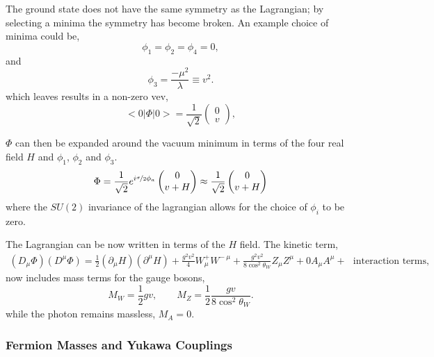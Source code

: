 The ground state does not have the same symmetry as the Lagrangian; by
selecting a minima the symmetry has become broken. An example choice of minima
could be,
\begin{equation}
\phi_{1} = \phi_{2} = \phi_{4} = 0,
\end{equation}
and
\begin{equation}
\phi_{3} = \frac{-\mu^{2}}{\lambda} \equiv v^{2}.
\end{equation}
which leaves results in a non-zero \ac{vev},
\begin{equation}
<0|\Phi|0> = \frac{1}{\sqrt{2}}\left(\begin{matrix}0\\v\end{matrix}\right),
\end{equation}

$\Phi$ can then be expanded around the vacuum minimum in terms of the four real
field $H$ and $\phi_1$, $\phi_2$ and $\phi_3$.
\begin{equation}
\Phi = 
\frac{1}{\sqrt{2}}
e^{i\nicefrac{\sigma}{2}\phi_a}
\left(\begin{matrix}0\\v+H\end{matrix}\right)
\approx 
\frac{1}{\sqrt{2}}
\left(\begin{matrix}0\\v+H\end{matrix}\right)
\end{equation}
where the $SU(2)$ invariance of the lagrangian allows for the choice of $\phi_i$
to be zero.\cite{unitarygauge}

The Lagrangian can be now written in terms of the $H$ field. The kinetic
term,\cite{ral}
\begin{align}
\left(D_{\mu}\Phi\right) \left(D^{\mu}\Phi\right) 
= \frac{1}{2} \left(\partial_{\mu}H\right) \left(\partial^{\mu}H\right)
+ \frac{g^{2}v^{2}}{4} W_{\mu}^{+} W^{-~\mu}
+ \frac{g^{2}v^{2}}{8 \cos^{2}\theta_{W}} Z_{\mu} Z^{\mu}
+ 0 A_{\mu} A^{\mu}
+ \text{~ interaction terms},
\end{align}
now includes mass terms for the gauge bosons,
\begin{equation}
M_{W} = \frac{1}{2}gv, \qquad 
M_{Z} = \frac{1}{2}\frac{gv}{8\cos^{2}\theta_{W}} .
\end{equation}
while the photon remains massless, $M_{A}=0$.

\subsubsection{Fermion Masses and Yukawa Couplings}

